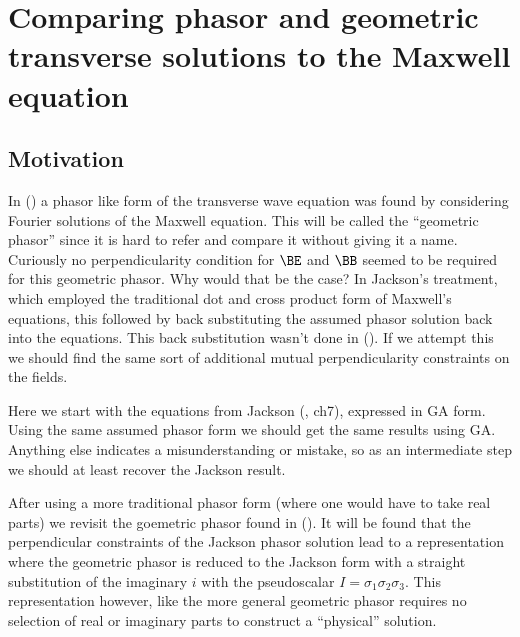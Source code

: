 

\chapter{Comparing phasor and geometric transverse solutions to the Maxwell equation}
\label{chap:transverseWave}
{}
\date{August 6, 2009}

\beginArtWithToc

\section{Motivation}

In (\cite{maxwellVacuum}) a phasor like form of the transverse wave equation was found by considering Fourier solutions of the Maxwell equation.  This will be called the ``geometric phasor'' since it is hard to refer and compare it without giving it a name.  Curiously no perpendicularity condition for $\BE$ and $\BB$ seemed to be required for this geometric phasor.  Why would that be the case?  In Jackson's treatment, which employed the traditional dot and cross product form of Maxwell's equations, this followed by back substituting the assumed phasor solution back into the equations.  This back substitution wasn't done in (\cite{maxwellVacuum}).  If we attempt this we should find the same sort of additional mutual perpendicularity constraints on the fields.

Here we start with the equations from Jackson (\cite{jackson1975cew}, ch7), expressed in GA form.  Using the same assumed phasor form we should get the same results using GA.  Anything else indicates a misunderstanding or mistake, so as an intermediate step we should at least recover the Jackson result.

After using a more traditional phasor form (where one would have to take real parts) we revisit the goemetric phasor found in (\cite{maxwellVacuum}).  It will be found that the perpendicular constraints of the Jackson phasor solution lead to a representation where the geometric phasor is reduced to the Jackson form with a straight substitution of the imaginary $i$ with the pseudoscalar $I = \sigma_1\sigma_2\sigma_3$.  This representation however, like the more general geometric phasor requires no selection of real or imaginary parts to construct a ``physical'' solution.

